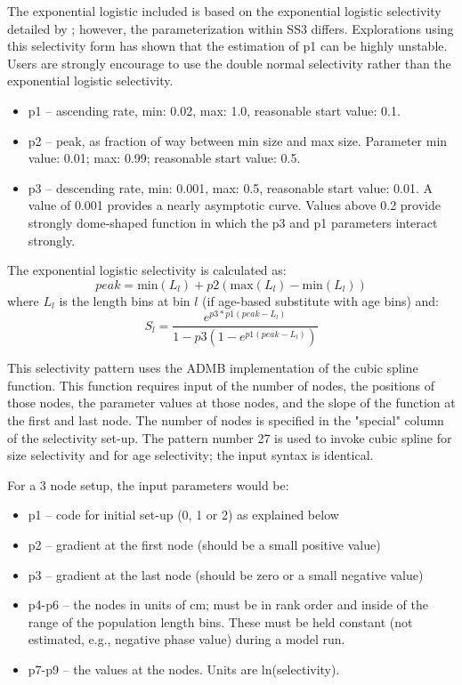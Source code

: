 The exponential logistic included is based on the exponential logistic selectivity detailed by \citet{thompson-confounding-1994}; however, the parameterization within SS3 differs.  Explorations using this selectivity form has shown that the estimation of p1 can be highly unstable.  Users are strongly encourage to use the double normal selectivity rather than the exponential logistic selectivity.
	\begin{itemize}
		\item p1 – ascending rate, min: 0.02, max: 1.0, reasonable start value: 0.1.
		\item p2 – peak, as fraction of way between min size and max size.  Parameter min value:  0.01; max:  0.99; reasonable start value: 0.5.
		\item p3 – descending rate, min: 0.001, max: 0.5, reasonable start value:  0.01.  A value of 0.001 provides a nearly asymptotic curve. Values above 0.2 provide strongly dome-shaped function in which the p3 and p1 parameters interact strongly.
	\end{itemize}

The exponential logistic selectivity is calculated as:
	\begin{equation}
	peak = \text{min}(L_l) + p2(\text{max}(L_l) - \text{min}(L_l) )
	\end{equation}
where $L_l$ is the length bins at bin $l$ (if age-based substitute with age bins) and:
	\begin{equation}
	S_l = \frac{e^{p3*p1(peak-L_l)}}{1-p3(1-e^{p1(peak- L_l)})}
	\end{equation}


This selectivity pattern uses the ADMB implementation of the cubic spline function. This function requires input of the number of nodes, the positions of those nodes, the parameter values at those nodes, and the slope of the function at the first and last node. The number of nodes is specified in the "special" column of the selectivity set-up.  The pattern number 27 is used to invoke cubic spline for size selectivity and for age selectivity; the input syntax is identical.
	
For a 3 node setup, the input parameters would be:
	\begin{itemize}
		\item p1 – 	code for initial set-up (0, 1 or 2) as explained below
		\item p2 – 	gradient at the first node (should be a small positive value)
		\item p3 – 	gradient at the last node (should be zero or a small negative value)
		\item p4-p6 – the nodes in units of cm; must be in rank order and inside of the range of the population length bins.  These must be held constant (not estimated, e.g., negative phase value) during a model run.
		\item  p7-p9 – the values at the nodes. Units are ln(selectivity).
	\end{itemize}

